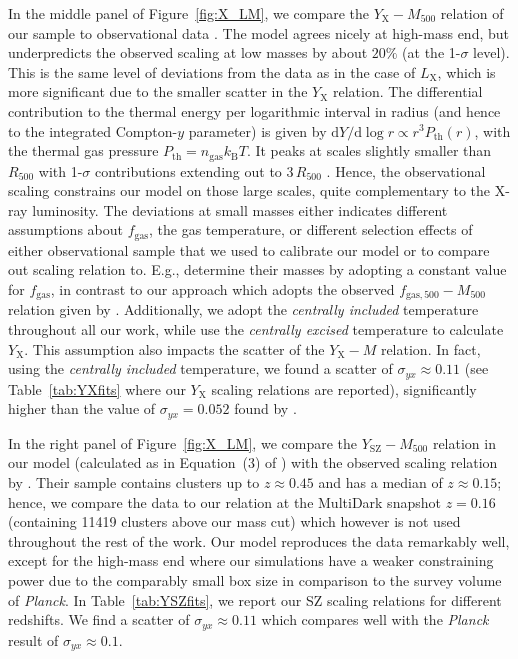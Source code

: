 \documentclass[traditabstract]{aa}
\newcommand{\rmn}{\mathrm}
\newcommand{\dd}{\mathrm{d}}
\begin{document}
In the middle panel of Figure~\ref{fig:X_LM}, we compare the
$Y_{\rmn{X}}-M_{500}$ relation of our sample to observational data
\citep{2010MNRAS.406.1773M}. The model agrees nicely at high-mass end, but
underpredicts the observed scaling at low masses by about $20\%$ (at the
1-$\sigma$ level). This is the same level of deviations from the data as in the
case of $L_{\rmn{X}}$, which is more significant due to the smaller scatter in
the $Y_{\rmn{X}}$ relation. The differential contribution to the thermal energy
per logarithmic interval in radius (and hence to the integrated Compton-$y$
parameter) is given by $\dd Y /\dd\log r \propto r^3 P_{\rmn{th}}(r)$, with the
thermal gas pressure $P_{\rmn{th}}=n_{\rmn{gas}}k_{\rmn{B}}T$. It peaks at
scales slightly smaller than $R_{500}$ with 1-$\sigma$ contributions extending
out to $3\,R_{500}$ \citep{2010ApJ...725...91B}. Hence, the observational
scaling constrains our model on those large scales, quite complementary to the
X-ray luminosity. The deviations at small masses either indicates different
assumptions about $f_{\rmn{gas}}$, the gas temperature, or different selection
effects of either observational sample that we used to calibrate our model or to
compare out scaling relation to. E.g., \cite{2010MNRAS.406.1773M} determine
their masses by adopting a constant value for $f_{\rmn{gas}}$, in contrast to
our approach which adopts the observed $f_{\rmn{gas},500}-M_{500}$ relation
given by \cite{2009ApJ...693.1142S}. Additionally, we adopt the \emph{centrally
  included} temperature \cite{2010MNRAS.406.1773M} throughout all our work,
while \cite{2010MNRAS.406.1773M} use the \emph{centrally excised} temperature to
calculate $Y_{\rmn{X}}$. This assumption also impacts the scatter of the
$Y_{\rmn{X}}-M$ relation. In fact, using the \emph{centrally included}
temperature, we found a scatter of $\sigma_{yx} \approx 0.11$ (see
Table~\ref{tab:YXfits} where our $Y_{\rmn{X}}$ scaling relations are reported),
significantly higher than the value of $\sigma_{yx} = 0.052$ found by
\cite{2010MNRAS.406.1773M}.

In the right panel of Figure~\ref{fig:X_LM}, we compare the
$Y_{\rmn{SZ}}-M_{500}$ relation in our model (calculated as in Equation~(3) of
\citealp{2011arXiv1109.3709B}) with the observed scaling relation by
\cite{2011A&A...536A..11P}. Their sample contains clusters up to $z \approx
0.45$ and has a median of $z \approx 0.15$; hence, we compare the data to our
relation at the MultiDark snapshot $z=0.16$ (containing 11419 clusters above our
mass cut) which however is not used throughout the rest of the work. Our model
reproduces the data remarkably well, except for the high-mass end where our
simulations have a weaker constraining power due to the comparably small box
size in comparison to the survey volume of {\em Planck}. In
Table~\ref{tab:YSZfits}, we report our SZ scaling relations for different
redshifts. We find a scatter of $\sigma_{yx} \approx 0.11$ which compares well
with the \emph{Planck} result of $\sigma_{yx} \approx 0.1$.
 
\end{document}
